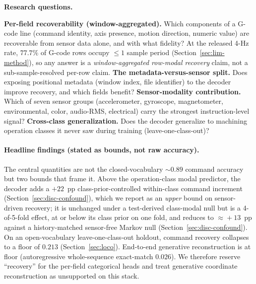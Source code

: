 \documentclass[sensors,article,submit,moreauthors,pdftex]{Definitions/mdpi}
\begin{document}
\textbf{Research questions.}
\begin{enumerate}[label=\textbf{RQ\arabic*.}, leftmargin=*]\let\item\olditem
\item \textbf{Per-field recoverability (window-aggregated).} Which components of a G-code line (command identity, axis presence, motion direction, numeric value) are recoverable from sensor data alone, and with what fidelity? At the released 4-Hz rate, $77.7\%$ of G-code rows occupy $\le\!1$ sample period (Section~\ref{sec:lim-method}), so any answer is a \emph{window-aggregated row-modal recovery} claim, not a sub-sample-resolved per-row claim.
\item \textbf{The metadata-versus-sensor split.} Does exposing positional metadata (window index, file identifier) to the decoder improve recovery, and which fields benefit?
\item \textbf{Sensor-modality contribution.} Which of seven sensor groups (accelerometer, gyroscope, magnetometer, environmental, color, audio-RMS, electrical) carry the strongest instruction-level signal?
\item \textbf{Cross-class generalization.} Does the decoder generalize to machining operation classes it never saw during training (leave-one-class-out)?
\end{enumerate}

\paragraph{Headline findings (stated as bounds, not raw accuracy).} The central quantities are not the closed-vocabulary $\sim\!0.89$ command accuracy but two bounds that frame it. Above the operation-class modal predictor, the decoder adds a $+22$~pp class-prior-controlled within-class command increment (Section~\ref{sec:disc-confound}), which we report as an \emph{upper} bound on sensor-driven recovery; it is unchanged under a test-derived class-modal null but is a 4-of-5-fold effect, at or below its class prior on one fold, and reduces to $\approx\!+13$~pp against a history-matched sensor-free Markov null (Section~\ref{sec:disc-confound}). On an open-vocabulary leave-one-class-out holdout, command recovery collapses to a floor of $0.213$ (Section~\ref{sec:loco}). End-to-end generative reconstruction is at floor (autoregressive whole-sequence exact-match $0.026$). We therefore reserve ``recovery'' for the per-field categorical heads and treat generative coordinate reconstruction as unsupported on this stack.
\end{document}
